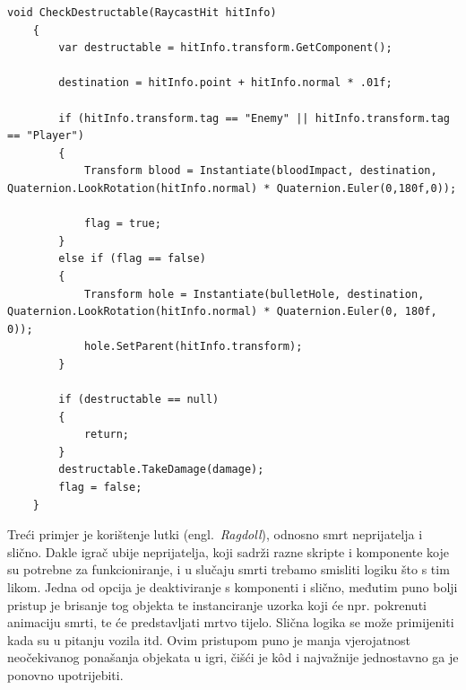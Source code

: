 \begin{lstlisting}[caption={Instanciranje metka}, label=Metak]
void CheckDestructable(RaycastHit hitInfo)
    {
        var destructable = hitInfo.transform.GetComponent();

        destination = hitInfo.point + hitInfo.normal * .01f;

        if (hitInfo.transform.tag == "Enemy" || hitInfo.transform.tag == "Player")
        {
            Transform blood = Instantiate(bloodImpact, destination, Quaternion.LookRotation(hitInfo.normal) * Quaternion.Euler(0,180f,0));
           
            flag = true;
        }
        else if (flag == false)
        {
            Transform hole = Instantiate(bulletHole, destination, Quaternion.LookRotation(hitInfo.normal) * Quaternion.Euler(0, 180f, 0));
            hole.SetParent(hitInfo.transform);
        }

        if (destructable == null)
        {
            return;
        }
        destructable.TakeDamage(damage);
        flag = false;
    }
\end{lstlisting}

Treći primjer je korištenje lutki (engl.~\textit{Ragdoll}), odnosno smrt neprijatelja i slično. Dakle igrač ubije neprijatelja, koji sadrži razne skripte i komponente koje su potrebne za funkcioniranje, i u slučaju smrti trebamo smisliti logiku što s tim likom. Jedna od opcija je deaktiviranje s komponenti i slično, međutim puno bolji pristup je brisanje tog objekta te instanciranje uzorka koji će npr. pokrenuti animaciju smrti, te će predstavljati mrtvo tijelo. Slična logika se može primijeniti kada su u pitanju vozila itd. Ovim pristupom puno je manja vjerojatnost neočekivanog ponašanja objekata u igri, čišći je k\^od i najvažnije jednostavno ga je ponovno upotrijebiti.

